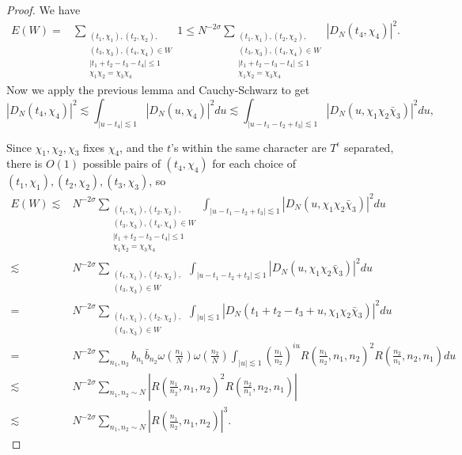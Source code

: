 \begin{proof}
    We have \begin{align*}    
    E(W)=& \sum_{\substack{(t_1,\chi_1),(t_2,\chi_2),\\ (t_3,\chi_3),(t_4,\chi_4)\in W\\|t_1+t_2-t_3-t_4|\leq 1\\ \chi_1\chi_2=\chi_3\chi_4}} 1 
    \leq N^{-2\sigma}\sum_{\substack{(t_1,\chi_1),(t_2,\chi_2),\\ (t_3,\chi_3),(t_4,\chi_4)\in W\\ |t_1+t_2-t_3-t_4|\leq 1\\ \chi_1\chi_2=\chi_3\chi_4}} |D_N(t_4,\chi_4)|^2.
    \end{align*}
    Now we apply the previous lemma and Cauchy-Schwarz to get \[
        |D_N(t_4,\chi_4)|^2\lesssim \int_{|u-t_4|\lesssim 1} |D_N(u,\chi_4)|^2du \lesssim  \int_{|u-t_1-t_2+t_3|\lesssim 1} |D_N(u,\chi_1\chi_2\bar{\chi}_3)|^2du,
    \]
   
    Since $\chi_1,\chi_2,\chi_3$ fixes $\chi_4$, and the $t$'s within the same character are $T^\epsilon$ separated, there is $O(1)$ possible pairs of $(t_4,\chi_4)$ for each choice of $(t_1,\chi_1),(t_2,\chi_2),(t_3,\chi_3)$, so \begin{align*}    
        E(W)\lesssim& N^{-2\sigma}\sum_{\substack{(t_1,\chi_1),(t_2,\chi_2),\\ (t_3,\chi_3),(t_4,\chi_4)\in W\\ |t_1+t_2-t_3-t_4|\leq 1\\ \chi_1\chi_2=\chi_3\chi_4}} \int_{|u-t_1-t_2+t_3|\lesssim 1} |D_N(u,\chi_1\chi_2\bar{\chi}_3)|^2du\\
        \lesssim&  N^{-2\sigma}\sum_{\substack{(t_1,\chi_1),(t_2,\chi_2),\\ (t_3,\chi_3)\in W}} \int_{|u-t_1-t_2+t_3|\lesssim 1} |D_N(u,\chi_1\chi_2\bar{\chi}_3)|^2du\\
        =& N^{-2\sigma}\sum_{\substack{(t_1,\chi_1),(t_2,\chi_2),\\ (t_3,\chi_3)\in W}} \int_{|u|\lesssim 1} |D_N(t_1+t_2-t_3 + u,\chi_1\chi_2\bar{\chi}_3)|^2du\\
        =&N^{-2\sigma}\sum_{n_1,n_2} b_{n_1}\bar{b}_{n_2} \omega\left(\frac{n_1}{N}\right)\omega\left(\frac{n_2}{N}\right)\int_{|u|\lesssim 1} \left(\frac{n_1}{n_2}\right)^{iu}R\left(\frac{n_1}{n_2},n_1,n_2\right)^2 R\left(\frac{n_2}{n_1},n_2,n_1\right)du\\
        \lesssim & N^{-2\sigma}\sum_{n_1,n_2\sim N}\left|R\left(\frac{n_1}{n_2},n_1,n_2\right)^2 R\left(\frac{n_2}{n_1},n_2,n_1\right)\right|\\
        \lesssim & N^{-2\sigma}\sum_{n_1,n_2\sim N}\left|R\left(\frac{n_1}{n_2},n_1,n_2\right) \right|^3.
        \end{align*}
\end{proof}


